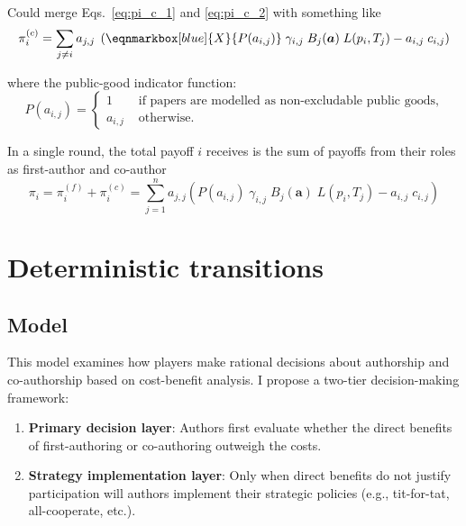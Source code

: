 \documentclass[12pt]{article}
\begin{document}
Could merge Eqs.~\ref{eq:pi_c_1} and \ref{eq:pi_c_2} with something like
\vspace{2em}
\begin{equation}
    \pi_i^{(c)} = 
    \sum_{j \neq i} 
    a_{j,j} \; 
    \left( 
        \eqnmarkbox[blue]{X}{P(a_{i,j})} \;
        \gamma_{i,j} \; B_j(\boldsymbol{a}) \; L(p_i, T_j)
        - 
        a_{i,j} \; c_{i,j}
    \right)
    \label{eq:pi_c}
\end{equation}

where the public-good indicator function:
\begin{equation}
    P(a_{i,j}) = 
    \begin{cases}
        1 & \text{ if papers are modelled as non-excludable public goods}, \\
        a_{i,j} & \text{ otherwise}.
    \end{cases}
\end{equation}

In a single round,
the total payoff $i$ receives is the sum of payoffs from their roles
as first-author and co-author
\begin{equation}
    \pi_i = \pi_i^{(f)} + \pi_i^{(c)} 
    = \sum_{j=1}^n a_{j,j} \left(
        P(a_{i,j}) \; \gamma_{i,j} \; B_j(\boldsymbol{a}) \; L(p_i, T_j) - a_{i,j} \; c_{i,j}
    \right)
\end{equation}

\section{Deterministic transitions}

\subsection{Model}

This model examines how players 
make rational decisions about authorship and co-authorship 
based on cost-benefit analysis. 
I propose a two-tier decision-making framework:
\begin{enumerate}
    \item {\bf Primary decision layer}: 
    Authors first evaluate whether the direct benefits of first-authoring or co-authoring outweigh the costs.
    \item {\bf Strategy implementation layer}: Only when direct benefits do not justify participation will authors implement their strategic policies 
    (e.g., tit-for-tat, all-cooperate, etc.).
\end{enumerate}
\end{document}
